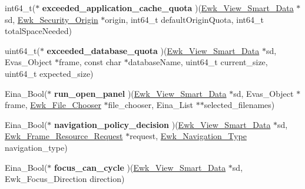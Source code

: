 \begin{DoxyCompactItemize}
\item 
\hypertarget{struct__Ewk__View__Smart__Class_a9fd8288f0ccc240a2ff24c204f23e8f6}{int64\+\_\+t($\ast$ {\bfseries exceeded\+\_\+application\+\_\+cache\+\_\+quota} )(\hyperlink{ewk__view_8h_a9a4bd081861301f6c55cb5da384dfc7d}{Ewk\+\_\+\+View\+\_\+\+Smart\+\_\+\+Data} $\ast$sd, \hyperlink{struct__Ewk__Security__Origin}{Ewk\+\_\+\+Security\+\_\+\+Origin} $\ast$origin, int64\+\_\+t default\+Origin\+Quota, int64\+\_\+t total\+Space\+Needed)}\label{struct__Ewk__View__Smart__Class_a9fd8288f0ccc240a2ff24c204f23e8f6}

\item 
\hypertarget{struct__Ewk__View__Smart__Class_a6354c2b5c844636c2178466cd68c13b1}{uint64\+\_\+t($\ast$ {\bfseries exceeded\+\_\+database\+\_\+quota} )(\hyperlink{ewk__view_8h_a9a4bd081861301f6c55cb5da384dfc7d}{Ewk\+\_\+\+View\+\_\+\+Smart\+\_\+\+Data} $\ast$sd, Evas\+\_\+\+Object $\ast$frame, const char $\ast$database\+Name, uint64\+\_\+t current\+\_\+size, uint64\+\_\+t expected\+\_\+size)}\label{struct__Ewk__View__Smart__Class_a6354c2b5c844636c2178466cd68c13b1}

\item 
\hypertarget{struct__Ewk__View__Smart__Class_a3899bad7807c3c01aef4dd9eaed5e190}{Eina\+\_\+\+Bool($\ast$ {\bfseries run\+\_\+open\+\_\+panel} )(\hyperlink{ewk__view_8h_a9a4bd081861301f6c55cb5da384dfc7d}{Ewk\+\_\+\+View\+\_\+\+Smart\+\_\+\+Data} $\ast$sd, Evas\+\_\+\+Object $\ast$frame, \hyperlink{struct__Ewk__File__Chooser}{Ewk\+\_\+\+File\+\_\+\+Chooser} $\ast$file\+\_\+chooser, Eina\+\_\+\+List $\ast$$\ast$selected\+\_\+filenames)}\label{struct__Ewk__View__Smart__Class_a3899bad7807c3c01aef4dd9eaed5e190}

\item 
\hypertarget{struct__Ewk__View__Smart__Class_aa4e5fca0f364da94e9a22ed3cabdc461}{Eina\+\_\+\+Bool($\ast$ {\bfseries navigation\+\_\+policy\+\_\+decision} )(\hyperlink{ewk__view_8h_a9a4bd081861301f6c55cb5da384dfc7d}{Ewk\+\_\+\+View\+\_\+\+Smart\+\_\+\+Data} $\ast$sd, \hyperlink{ewk__frame_8h_acddf624050dec184d7071e77847d1d94}{Ewk\+\_\+\+Frame\+\_\+\+Resource\+\_\+\+Request} $\ast$request, \hyperlink{ewk__frame_8h_aa1bdc646f41f64373f0fc9bbf5178033}{Ewk\+\_\+\+Navigation\+\_\+\+Type} navigation\+\_\+type)}\label{struct__Ewk__View__Smart__Class_aa4e5fca0f364da94e9a22ed3cabdc461}

\item 
\hypertarget{struct__Ewk__View__Smart__Class_aa605e0d2333d49b5ac409e908334e5d0}{Eina\+\_\+\+Bool($\ast$ {\bfseries focus\+\_\+can\+\_\+cycle} )(\hyperlink{ewk__view_8h_a9a4bd081861301f6c55cb5da384dfc7d}{Ewk\+\_\+\+View\+\_\+\+Smart\+\_\+\+Data} $\ast$sd, Ewk\+\_\+\+Focus\+\_\+\+Direction direction)}\label{struct__Ewk__View__Smart__Class_aa605e0d2333d49b5ac409e908334e5d0}

\end{DoxyCompactItemize}



